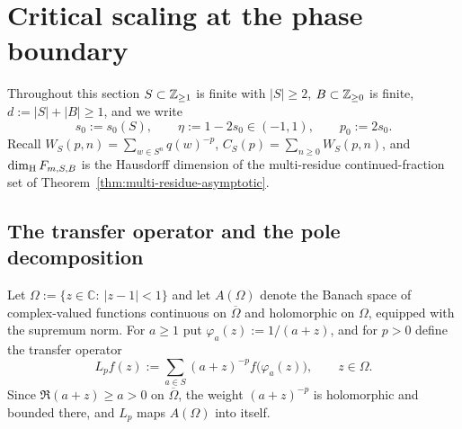 %

\section{Critical scaling at the phase boundary}\label{sec:critical-scaling}

Throughout this section $S\subset\mathbb{Z}_{\ge1}$ is finite with $|S|\ge2$,
$B\subset\mathbb{Z}_{\ge0}$ is finite, $d:=|S|+|B|\ge1$, and we write
\[
s_0:=s_0(S),\qquad \eta:=1-2s_0\in(-1,1),\qquad p_0:=2s_0 .
\]
Recall $W_S(p,n)=\sum_{w\in S^n}q(w)^{-p}$, $C_S(p)=\sum_{n\ge0}W_S(p,n)$,
and $\dim_{\mathrm{H}} F_{m,S,B}$ is the Hausdorff dimension of the multi-residue
continued-fraction set of Theorem~\ref{thm:multi-residue-asymptotic}.

\subsection{The transfer operator and the pole decomposition}

Let $\Omega:=\{z\in\mathbb{C}:\ |z-1|<1\}$ and let $A(\Omega)$ denote the Banach space
of complex-valued functions continuous on $\overline\Omega$ and holomorphic on
$\Omega$, equipped with the supremum norm. For $a\ge1$ put
$\varphi_a(z):=1/(a+z)$, and for $p>0$ define the transfer operator
\begin{equation}\label{eq:Lp}
L_pf(z):=\sum_{a\in S}(a+z)^{-p}f\bigl(\varphi_a(z)\bigr),\qquad z\in\Omega .
\end{equation}
Since $\Re(a+z)\ge a>0$ on $\overline\Omega$, the weight $(a+z)^{-p}$ is
holomorphic and bounded there, and $L_p$ maps $A(\Omega)$ into itself.

